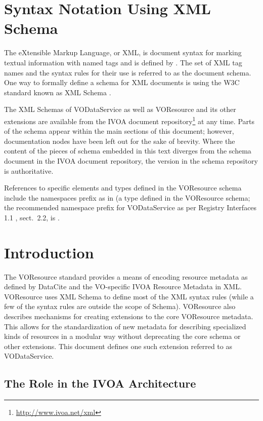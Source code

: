 \documentclass[11pt,a4paper]{ivoa}
\begin{document}
\section*{Syntax Notation Using XML Schema}

The eXtensible Markup Language, or XML, is document syntax for marking
textual information with named tags and is defined by \citet{std:XML}.
The set of XML tag names and the syntax
rules for their use is referred to as the document schema.  One way to
formally define a schema for XML documents is using the W3C standard
known as XML Schema \citep{std:XSD}.

The XML Schemas of VODataService as well as VOResource and its other
extensions are
available from the IVOA document
repository\footnote{\url{http://www.ivoa.net/xml}} at any time.
Parts of the schema appear within the main sections of this document;
however, documentation nodes have been left out for the sake of brevity.
Where the content of the pieces of schema embedded in this text
diverges from the schema document in the IVOA document
repository, the version in the schema repository is authoritative.

References to specific elements and types defined in the VOResource
schema include the namespaces prefix  as in
 (a type defined in the VOResource schema; the
recommended namespace prefix for VODataService as per Registry
Interfaces 1.1 \citep{2018ivoa.spec.0723D}, sect.~2.2, is .

\section{Introduction}

The VOResource standard \citep{2018ivoa.spec.0625P} provides a means of
encoding resource metadata as defined by DataCite \citep{std:DataCite40}
and the VO-specific IVOA Resource Metadata \citep{2007ivoa.spec.0302H} in XML.
VOResource uses XML Schema \citep{std:XSD} to define
most of the XML syntax rules (while a few of the syntax rules are
outside the scope of Schema).  VOResource also describes mechanisms
for creating extensions to the core VOResource metadata.  This allows
for the standardization of new metadata for describing specialized
kinds of resources in a modular way without deprecating the core
schema or other extensions.  This document defines one such extension
referred to as VODataService.

\subsection{The Role in the IVOA Architecture}
\end{document}
